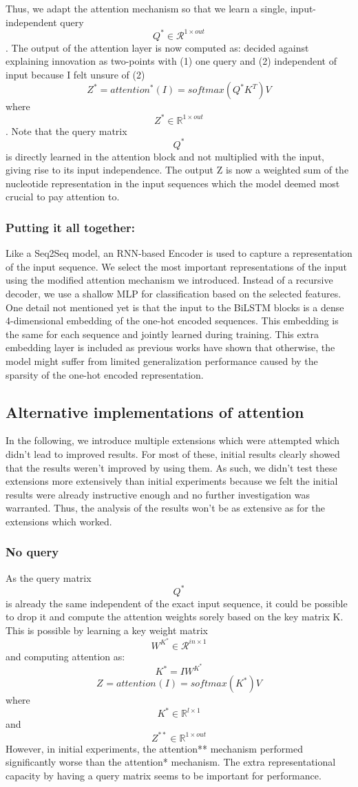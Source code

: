 Thus, we adapt the attention mechanism so that we learn a single, input-independent query $${Q}^* \in \mathcal{R}^{1 \times out}$$. The output of the attention layer is now computed as:
decided against explaining innovation as two-points with (1) one query and (2) independent of input because I felt unsure of (2)
$$Z^* = {attention}^*(I) = softmax({Q}^*K^T)V$$
where $$Z^* \in \mathbb{R}^{1 \times out}$$. Note that the query matrix $${Q}^*$$ is directly learned in the attention block and not multiplied with the input, giving rise to its input independence. The output Z is now a weighted sum of the nucleotide representation in the input sequences which the model deemed most crucial to pay attention to.
\subsubsection{Putting it all together:}
Like a Seq2Seq model, an RNN-based Encoder is used to capture a representation of the input sequence. We select the most important representations of the input using the modified attention mechanism we introduced. Instead of a recursive decoder, we use a shallow MLP for classification based on the selected features.
One detail not mentioned yet is that the input to the BiLSTM blocks is a dense 4-dimensional embedding of the one-hot encoded sequences. This embedding is the same for each sequence and jointly learned during training. This extra embedding layer is included as previous works have shown that otherwise, the model might suffer from limited generalization performance caused by the sparsity of the one-hot encoded representation. 
\subsection{Alternative implementations of attention}
In the following, we introduce multiple extensions which were attempted which didn't lead to improved results. For most of these, initial results clearly showed that the results weren't improved by using them. As such, we didn't test these extensions more extensively than initial experiments because we felt the initial results were already instructive enough and no further investigation was warranted. Thus, the analysis of the results won't be as extensive as for the extensions which worked.
\subsubsection{No query}
As the query matrix $${Q}^*$$ is already the same independent of the exact input sequence, it could be possible to drop it and compute the attention weights sorely based on the key matrix K.
This is possible by learning a key weight matrix $$W^{K^*} \in \mathcal{R}^{in \times 1}$$ and computing attention as:
$$K^* = IW^{K^*}$$
$$Z^{} = {attention}^{}(I) = softmax(K^*)V$$
where $$K^* \in \mathbb{R}^{l \times 1}$$ and $$Z^{**} \in \mathbb{R}^{1 \times out}$$
However, in initial experiments, the attention** mechanism performed significantly worse than the attention* mechanism. The extra representational capacity by having a query matrix seems to be important for performance.

